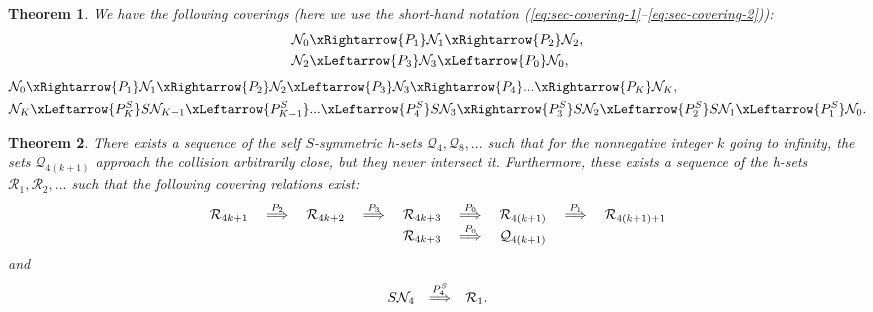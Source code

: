\documentclass[1p]{article}
\newtheorem{theorem}{Theorem}
\begin{document}
\begin{theorem}
    \label{thm:covering_relations_1_3}
    \cite{CAPINSKI2026109173} 
    We have the following coverings (here we use the short-hand notation (\ref{eq:sec-covering-1}--\ref{eq:sec-covering-2})):
    \begin{align}
        \label{eq:covering_sequence_c1}
        &\mathcal{N}_0 \xRightarrow{P_1}
        \mathcal{N}_1 \xRightarrow{P_2}
        \mathcal{N}_2, \\
        \label{eq:covering_sequence_c2}
        &\mathcal{N}_2 \xLeftarrow{P_3}
        \mathcal{N}_3 \xLeftarrow{P_0}
        \mathcal{N}_0,
    \end{align}
    \begin{align}
        \label{eq:covering_sequence_o1}
        &\mathcal{N}_0 \xRightarrow{P_1}
        \mathcal{N}_1 \xRightarrow{P_2} 
        \mathcal{N}_2 \xLeftarrow{P_3} 
        \mathcal{N}_3 \xRightarrow{P_4} ... \xRightarrow{P_K}
        \mathcal{N}_K, \\
        \label{eq:covering_sequence_o2}
        &\mathcal{N}_K \xLeftarrow{P^S_K}
        S \mathcal{N}_{K-1} \xLeftarrow{P^S_{K-1}} ... \xLeftarrow{P^S_4}
        S \mathcal{N}_3 \xRightarrow{P^S_3}
        S \mathcal{N}_2 \xLeftarrow{P^S_2}
        S \mathcal{N}_1 \xLeftarrow{P^S_1}
        \mathcal{N}_0.
     \end{align}
\end{theorem}

\begin{theorem}
    \label{thm:covering_relations_R_Q}
    \cite{CAPINSKI2026109173} 
    There exists a sequence of the self $S$-symmetric h-sets $\mathcal{Q}_4, \mathcal{Q}_8, ...$ such that for the nonnegative integer $k$ going to infinity, the sets 
    $\mathcal{Q}_{4(k+1)}$ approach the collision arbitrarily close, but they never intersect it. Furthermore, these exists a sequence of the h-sets $\mathcal{R}_1, \mathcal{R}_2, ...$ such that the following covering relations exist:
    \begin{equation}
        \label{eq:R-Q-coverings}
        \begin{array}[c]{ccccccccc}
        \mathcal{R}_{4k+1}  & \overset{P_{2}}{\implies}& \mathcal{R}_{4k+2} & \overset{P_{3}}{\implies} & \mathcal{R}_{4k+3} & \overset{P_{0}}{\implies} & \mathcal{R}_{4\left(k+1\right)} & \overset{P_{1}}{\implies} & \mathcal{R}_{4\left(k+1\right)+1}\\
        & & &  & \mathcal{R}_{4k+3} & \overset{P_{0}}{\implies} & \mathcal{Q}_{4\left(k+1\right)} & &\\
        \end{array}
    \end{equation}
    and
    \begin{equation}
        \label{eq:gluing}
        \begin{array}[c]{rcc}
            S\mathcal{N}_{4} & \overset{P^S_{4}}{\Longrightarrow} & \mathcal{R}_{1}.\\
        \end{array}
    \end{equation}
\end{theorem}
\end{document}
